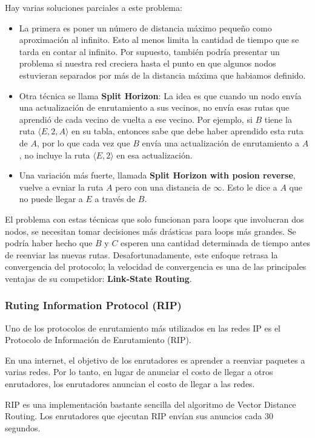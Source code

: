 Hay varias soluciones parciales a este problema:
\begin{itemize}
  \item La primera es poner un número de distancia máximo pequeño como aproximación al infinito. Esto al menos limita la cantidad de tiempo que se tarda en contar al infinito. Por supuesto, también podría presentar un problema si nuestra red creciera hasta el punto en que algunos nodos estuvieran separados por más de la distancia máxima que habiamos definido.
  \item Otra técnica se llama \textbf{Split Horizon}: La idea es que cuando un nodo envía una actualización de enrutamiento a sus vecinos, no envía esas rutas que aprendió de cada vecino de vuelta a ese vecino. Por ejemplo, si \(B\) tiene la ruta \(\langle E, 2, A\rangle\) en su tabla, entonces sabe que debe haber aprendido esta ruta de \(A\), por lo que cada vez que \(B\) envía una actualización de enrutamiento a \(A\), no incluye la ruta \(\langle E, 2\rangle\) en esa actualización.
  \item Una variación más fuerte, llamada \textbf{Split Horizon with posion reverse}, vuelve a evniar la ruta \(A\) pero con una distancia de \(\infty\). Esto le dice a \(A\) que no puede llegar a \(E\) a través de \(B\).
\end{itemize}

El problema con estas técnicas que solo funcionan para loops que involucran dos nodos, se necesitan tomar decisiones más drásticas para loops más grandes. Se podría haber hecho que \(B\) y \(C\) esperen una cantidad determinada de tiempo antes de reenviar las nuevas rutas. Desafortunadamente, este enfoque retrasa la convergencia del protocolo; la velocidad de convergencia es una de las principales ventajas de su competidor: \textbf{Link-State Routing}.

\subsubsection*{Ruting Information Protocol (RIP)}
Uno de los protocolos de enrutamiento más utilizados en las redes IP es el Protocolo de Información de Enrutamiento (RIP).

En una internet, el objetivo de los enrutadores es aprender a reenviar paquetes a varias redes. Por lo tanto, en lugar de anunciar el costo de llegar a otros enrutadores, los enrutadores anuncian el costo de llegar a las redes.

RIP es una implementación bastante sencilla del algoritmo de Vector Distance Routing. Los enrutadores que ejecutan RIP envían sus anuncios cada 30 segundos.

